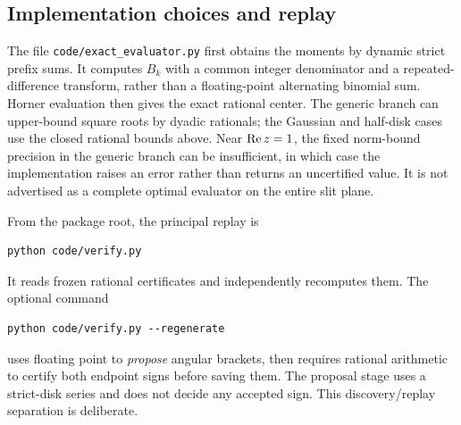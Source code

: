 \subsection{Implementation choices and replay}
The file \texttt{code/exact\_evaluator.py} first obtains the moments
by dynamic strict prefix sums. It computes $B_k$ with a common integer
denominator and a repeated-difference transform, rather than a
floating-point alternating binomial sum. Horner evaluation then gives
the exact rational center. The generic branch can upper-bound square
roots by dyadic rationals; the Gaussian and half-disk cases use the
closed rational bounds above. Near $\operatorname{Re} z=1$, the fixed norm-bound
precision in the generic branch can be insufficient, in which case the
implementation raises an error rather than returns an uncertified value.
It is not advertised as a complete optimal evaluator on the entire slit
plane.

From the package root, the principal replay is
\begin{verbatim}
python code/verify.py
\end{verbatim}
It reads frozen rational certificates and independently recomputes them.
The optional command
\begin{verbatim}
python code/verify.py --regenerate
\end{verbatim}
uses floating point to \emph{propose} angular brackets, then requires
rational arithmetic to certify both endpoint signs before saving them.
The proposal stage uses a strict-disk series and does not decide any
accepted sign. This discovery/replay separation is deliberate.


